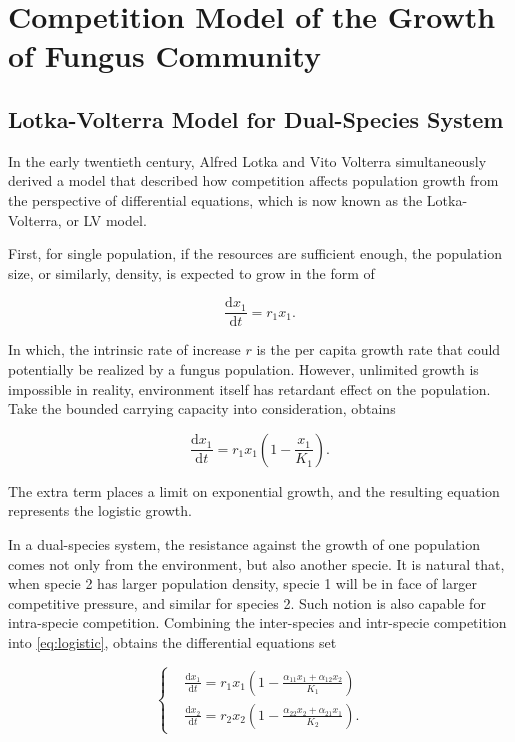 \section{Competition Model of the Growth of Fungus Community}\label{sec:LV}


\subsection{Lotka-Volterra Model for Dual-Species System}

In the early twentieth century, Alfred Lotka and Vito Volterra simultaneously derived a model that described how competition affects population growth from the perspective of differential equations, which is now known as the Lotka-Volterra, or LV model.

First, for single population, if the resources are sufficient enough, the population size, or similarly, density, is expected to grow in the form of

\begin{equation}\label{eq:exp}
    \frac{\mathrm{d}x_1}{\mathrm{d}t} = r_1x_1.
\end{equation}

In which, the intrinsic rate of increase $r$ is the per capita growth rate that could potentially be realized by a fungus population. However, unlimited growth is impossible in reality, environment itself has retardant effect on the population. Take the bounded carrying capacity into consideration, obtains

\begin{equation}\label{eq:logistic}
    \frac{\mathrm{d}x_1}{\mathrm{d}t} =
    r_1x_1\left(1 - \frac{x_1}{K_1}\right).
\end{equation}

The extra term places a limit on exponential growth, and the resulting equation represents the logistic growth.

In a dual-species system, the resistance against the growth of one population comes not only from the environment, but also another specie. It is natural that, when specie 2 has larger population density, specie 1 will be in face of larger competitive pressure, and similar for species 2. Such notion is also capable for intra-specie competition. Combining the inter-species and intr-specie competition into \eqref{eq:logistic}, obtains the differential equations set

\begin{equation}\label{eq:dual}
    \left\{\begin{aligned}     &
        \frac{\mathrm{d}x_1}{\mathrm{d}t} =
        r_1x_1\left(1 - \frac{\alpha_{11}x_1 + \alpha_{12}x_2}{K_1}\right) \\ &
        \frac{\mathrm{d}x_2}{\mathrm{d}t} =
        r_2x_2\left(1 - \frac{\alpha_{22}x_2 + \alpha_{21}x_1}{K_2}\right).
    \end{aligned}\right.
\end{equation}

